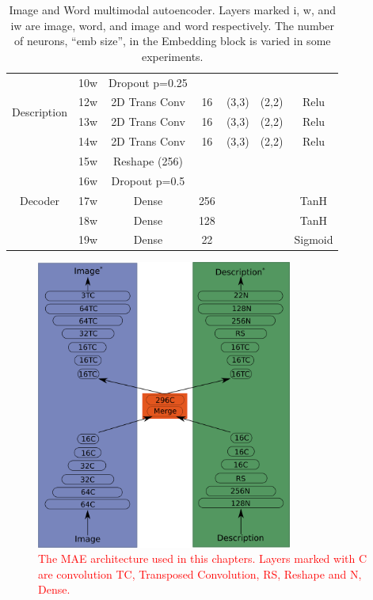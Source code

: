 \begin{table}
\begin{tabular}{|c|c|c|c|c|c|c|}
			\multirow{4}{*}{Description} & 10w 	&	Dropout p=0.25 &	 & 	     &       & \\ \cline{2-7}
			& 12w	&	2D Trans Conv & 16 & (3,3) & (2,2)  & Relu \\ \cline{2-7}
			& 13w	&	2D Trans Conv & 16 & (3,3) & (2,2)  & Relu \\ \cline{2-7}
			& 14w	&	2D Trans Conv & 16 & (3,3) & (2,2)  & Relu \\ \cline{2-7}
\multirow{5}{*}{Decoder}& 15w	& Reshape (256) & & & & \\ \cline{2-7}
			& 16w	& Dropout p=0.5 &	 & 	     &       & \\ \cline{2-7}
			& 17w	& Dense & 256 & & &TanH \\ \cline{2-7}
			& 18w	& Dense & 128 & & &TanH \\ \cline{2-7}
			& 19w	& Dense & 22 & & & Sigmoid \\ \hline
			
			
		\end{tabular}
		\caption{Image and Word multimodal autoencoder. Layers marked i, w, and iw are image, word, and image and word respectively. The number of neurons, ``emb size'', in the Embedding block is varied in some experiments.}
		\label{tab:Arts_MAE_description}

	\end{table}
	
\begin{figure}
\centering
\includegraphics[width=0.75\textwidth]{Figs/shapes/maeArch.png}
\caption{\textcolor{red}{The \ac{MAE} architecture used in this chapters. Layers marked with C are convolution TC, Transposed Convolution, RS, Reshape and N, Dense.}}
\label{fig:netArts}
\end{figure}

